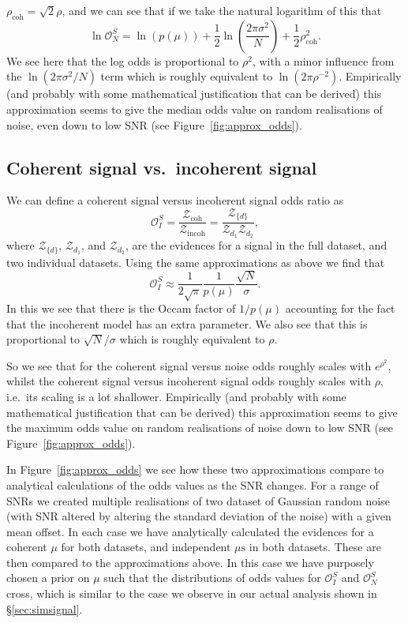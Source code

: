 $\rho_{\text{coh}} = \sqrt{2}\rho$, and we can see that if we take the natural logarithm of this that
\begin{equation}
\ln{\mathcal{O}_N^S} = \ln{(p(\mu))} + \frac{1}{2}\ln{\left(\frac{2\pi\sigma^2}{N}\right)} + \frac{1}{2}\rho_{\text{coh}}^2.
\end{equation}
We see here that the log odds is proportional to $\rho^2$, with a minor influence from the $\ln{\left(2\pi\sigma^2/N\right)}$ term which is roughly equivalent
to $\ln{\left(2\pi\rho^{-2}\right)}$. Empirically (and probably with some mathematical justification that can be derived) this approximation seems to give the
median odds value on random realisations of noise, even down to low SNR (see Figure~\ref{fig:approx_odds}).

\subsection{Coherent signal vs.\ incoherent signal}

We can define a coherent signal versus incoherent signal odds ratio as
\begin{equation}
\mathcal{O}^{S}_I = \frac{\mathcal{Z}_{\text{coh}}}{\mathcal{Z}_{\text{incoh}}} = \frac{\mathcal{Z}_{\{d\}}}{\mathcal{Z}_{d_1}\mathcal{Z}_{d_2}},
\end{equation}
where $\mathcal{Z}_{\{d\}}$, $\mathcal{Z}_{d_1}$, and $\mathcal{Z}_{d_2}$, are the evidences for a signal in the full dataset, and two individual
datasets. Using the same approximations as above we find that
\begin{equation}
\mathcal{O}^{S}_I \approx \frac{1}{2\sqrt{\pi}}\frac{1}{p(\mu)}\frac{\sqrt{N}}{\sigma}.
\end{equation}
In this we see that there is the Occam factor of $1/p(\mu)$ accounting for the fact that the incoherent model has an extra parameter. We also see that this is
proportional to $\sqrt{N}/\sigma$ which is roughly equivalent to $\rho$.

So we see that for the coherent signal versus noise odds roughly scales with $e^{\rho^2}$, whilst the coherent signal versus incoherent signal odds roughly scales with
$\rho$, i.e.\ its scaling is a lot shallower. Empirically (and probably with some mathematical justification that can be derived) this approximation seems to give the
maximum odds value on random realisations of noise down to low SNR (see Figure~\ref{fig:approx_odds}).

In Figure~\ref{fig:approx_odds} we see how these two approximations compare to analytical calculations of the odds values as the SNR changes. For a range of SNRs
we created multiple realisations of two dataset of Gaussian random noise (with SNR altered by altering the standard deviation of the noise) with a given
mean offset. In each case we have analytically calculated the evidences for a coherent $\mu$ for both datasets, and independent $\mu\text{s}$ in both datasets.
These are then compared to the approximations above. In this case we have purposely chosen a prior on $\mu$ such that the distributions of odds values for
$\mathcal{O}^{S}_I$ and $\mathcal{O}_N^S$ cross, which is similar to the case we observe in our actual analysis shown in \S\ref{sec:simsignal}.
